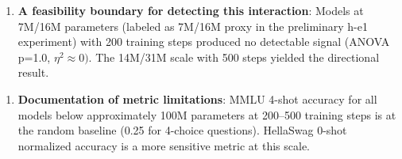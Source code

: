 \begin{enumerate}
\item \textbf{A feasibility boundary for detecting this interaction}: Models at 7M/16M parameters (labeled as 7M/16M proxy in the preliminary h-e1 experiment) with 200 training steps produced no detectable signal (ANOVA p=1.0, $\eta^{2}\approx 0)$. The 14M/31M scale with 500 steps yielded the directional result.
\end{enumerate}

\begin{enumerate}
\item \textbf{Documentation of metric limitations}: MMLU 4-shot accuracy for all models below approximately 100M parameters at 200--500 training steps is at the random baseline (0.25 for 4-choice questions). HellaSwag 0-shot normalized accuracy is a more sensitive metric at this scale.
\end{enumerate}

